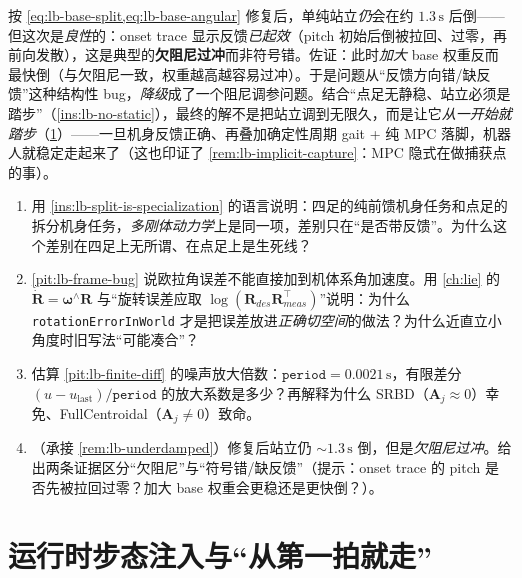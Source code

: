 \begin{remark}\label{rem:lb-underdamped}
按 \cref{eq:lb-base-split,eq:lb-base-angular} 修复后，单纯站立\emph{仍}会在约 $1.3\,\mathrm{s}$ 后倒——但这次是\emph{良性}的：onset trace 显示反馈\emph{已起效}（pitch 初始后倒被拉回、过零，再前向发散），这是典型的\textbf{欠阻尼过冲}而非符号错。佐证：此时\emph{加大} base 权重反而最快倒（与欠阻尼一致，权重越高越容易过冲）。于是问题从“反馈方向错/缺反馈”这种结构性 bug，\emph{降级}成了一个阻尼调参问题。结合“点足无静稳、站立必须是踏步”（\cref{ins:lb-no-static}），最终的解不是把站立调到无限久，而是让它\emph{从一开始就踏步}（\cref{sec:lb-runtime}）——一旦机身反馈正确、再叠加确定性周期 gait + 纯 MPC 落脚，机器人就稳定走起来了（这也印证了 \cref{rem:lb-implicit-capture}：MPC 隐式在做捕获点的事）。
\end{remark}

\begin{practice}
\begin{enumerate}
  \item 用 \cref{ins:lb-split-is-specialization} 的语言说明：四足的纯前馈机身任务和点足的拆分机身任务，\emph{多刚体动力学}上是同一项，差别只在“是否带反馈”。为什么这个差别在四足上无所谓、在点足上是生死线？
  \item \cref{pit:lb-frame-bug} 说欧拉角误差不能直接加到机体系角加速度。用 \cref{ch:lie} 的 $\dot{\mathbf{R}}=\boldsymbol\omega^\wedge\mathbf{R}$ 与“旋转误差应取 $\log(\mathbf{R}_{des}\mathbf{R}_{meas}^\top)$”说明：为什么 \texttt{rotationErrorInWorld} 才是把误差放进\emph{正确切空间}的做法？为什么近直立小角度时旧写法“可能凑合”？
  \item 估算 \cref{pit:lb-finite-diff} 的噪声放大倍数：$\texttt{period}=0.0021\,\mathrm{s}$，有限差分 $(u-u_{\mathrm{last}})/\texttt{period}$ 的放大系数是多少？再解释为什么 SRBD（$\mathbf{A}_j\approx 0$）幸免、FullCentroidal（$\mathbf{A}_j\ne 0$）致命。
  \item （承接 \cref{rem:lb-underdamped}）修复后站立仍 $\sim 1.3\,\mathrm{s}$ 倒，但是\emph{欠阻尼过冲}。给出两条证据区分“欠阻尼”与“符号错/缺反馈”（提示：onset trace 的 pitch 是否先被拉回过零？加大 base 权重会更稳还是更快倒？）。
\end{enumerate}
\end{practice}

\section{运行时步态注入与“从第一拍就走”}
\label{sec:lb-runtime}

